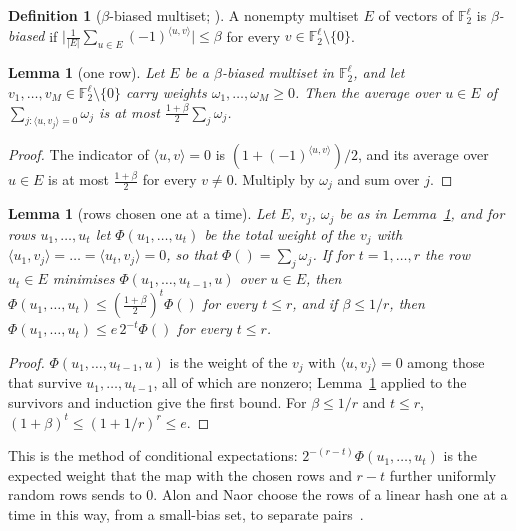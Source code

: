 \documentclass[11pt]{article}
\newtheorem{lemma}[theorem]{Lemma}
\theoremstyle{definition}
\newtheorem{definition}[theorem]{Definition}
\theoremstyle{remark}
\newcommand{\F}{\mathbb{F}_2}
\begin{document}
\begin{definition}[$\beta$-biased multiset; {\cite[Definition~3, p.~5]{AGHP92}}]\label{x:def:biased}
A nonempty multiset $E$ of vectors of $\F^\ell$ is \emph{$\beta$-biased} if $\bigl|\frac1{|E|}\sum_{u\in E}(-1)^{\langle u,v\rangle}\bigr|\le\beta$ for every $v\in\F^\ell\setminus\{0\}$.
\end{definition}

\begin{lemma}[one row]\label{x:lem:select}
Let $E$ be a $\beta$-biased multiset in $\F^\ell$, and let $v_1,\dots,v_M\in\F^\ell\setminus\{0\}$ carry weights $\omega_1,\dots,\omega_M\ge0$. Then the average over $u\in E$ of $\sum_{j:\langle u,v_j\rangle=0}\omega_j$ is at most $\frac{1+\beta}2\sum_j\omega_j$.
\end{lemma}
\begin{proof}
The indicator of $\langle u,v\rangle=0$ is $(1+(-1)^{\langle u,v\rangle})/2$, and its average over $u\in E$ is at most $\frac{1+\beta}2$ for every $v\ne0$. Multiply by $\omega_j$ and sum over $j$.
\end{proof}

\begin{lemma}[rows chosen one at a time]\label{x:lem:greedy}
Let $E$, $v_j$, $\omega_j$ be as in Lemma~\ref{x:lem:select}, and for rows $u_1,\dots,u_t$ let $\Phi(u_1,\dots,u_t)$ be the total weight of the $v_j$ with $\langle u_1,v_j\rangle=\dots=\langle u_t,v_j\rangle=0$, so that $\Phi()=\sum_j\omega_j$. If for $t=1,\dots,r$ the row $u_t\in E$ minimises $\Phi(u_1,\dots,u_{t-1},u)$ over $u\in E$, then $\Phi(u_1,\dots,u_t)\le(\frac{1+\beta}2)^t\Phi()$ for every $t\le r$, and if $\beta\le1/r$, then $\Phi(u_1,\dots,u_t)\le e\,2^{-t}\Phi()$ for every $t\le r$.
\end{lemma}
\begin{proof}
$\Phi(u_1,\dots,u_{t-1},u)$ is the weight of the $v_j$ with $\langle u,v_j\rangle=0$ among those that survive $u_1,\dots,u_{t-1}$, all of which are nonzero; Lemma~\ref{x:lem:select} applied to the survivors and induction give the first bound. For $\beta\le1/r$ and $t\le r$, $(1+\beta)^t\le(1+1/r)^r\le e$.
\end{proof}

This is the method of conditional expectations: $2^{-(r-t)}\Phi(u_1,\dots,u_t)$ is the expected weight that the map with the chosen rows and $r-t$ further uniformly random rows sends to $0$. Alon and Naor choose the rows of a linear hash one at a time in this way, from a small-bias set, to separate pairs~\cite[Section~3.1]{AN96}.
\end{document}
